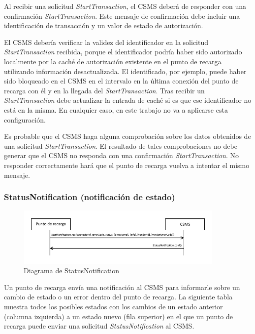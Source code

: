 \documentclass[12pt,a4paper,onecolumn,oneside]{report}
\begin{document}
Al recibir una solicitud \textit{StartTransaction}, el CSMS deberá de responder con una confirmación \textit{StartTransaction}. Este mensaje de confirmación debe incluir una identificación de transacción y un valor de estado de autorización.

El CSMS debería verificar la validez del identificador en la solicitud \textit{StartTransaction} recibida, porque el identificador podría haber sido autorizado localmente por la caché de autorización existente en el punto de recarga utilizando información desactualizada. El identificado, por ejemplo, puede haber sido bloqueado en el CSMS en el intervalo en la última conexión del punto de recarga con él y en la llegada del \textit{StartTransaction}. Tras recibir un \textit{StartTransaction} debe actualizar la entrada de caché si es que ese identificador no está en la misma. En cualquier caso, en este trabajo no va a aplicarse esta configuración.

Es probable que el CSMS haga alguna comprobación sobre los datos obtenidos de una solicitud \textit{StartTransaction}. El resultado de tales comprobaciones no debe generar que el CSMS no responda con una confirmación \textit{StartTransaction}. No responder correctamente hará que el punto de recarga vuelva a intentar el mismo mensaje.


\subsubsection{StatusNotification (notificación de estado)}
\label{StatusNotification (notificación de estado)}


\begin{figure}[h] 
\centering
  \includegraphics[width=0.9\textwidth]{figuras/diagramastatusnotification.png}
  \caption[Diagrama de \textit{StatusNotification}]{Diagrama de StatusNotification\\
  }
  \label{fig:diagramastatusnotification}
\end{figure}



Un punto de recarga envía una notificación al CSMS para informarle sobre un cambio de estado o un error dentro del punto de recarga. La siguiente tabla muestra todos los posibles estados con los cambios de un estado anterior (columna izquierda) a un estado nuevo (fila superior) en el que un punto de recarga puede enviar una solicitud \textit{StatusNotification} al CSMS.
\end{document}
